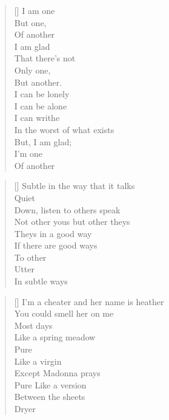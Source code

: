 \documentclass{article}
\begin{document}
\settowidth{\versewidth}{Than Tycho Brahe, or Erra Pater:}
\begin{verse}[\versewidth]
I am one            \\
But one,            \\
Of another          \\
I am glad           \\
That there's not    \\
Only one,           \\
But another.        \\
I can be lonely     \\
I can be alone      \\
I can writhe        \\
In the worst of what exists \\
But, I am glad;     \\
I'm one             \\
Of another          \\
\end{verse}

\settowidth{\versewidth}{Than Tycho Brahe, or Erra Pater:}
\begin{verse}[\versewidth]
Subtle in the way that it talks \\
Quiet \\
Down, listen to others speak \\
Not other yous but other theys \\
Theys in a good way \\ 
If there are good ways \\
To other \\
Utter \\
In subtle ways \\
\end{verse}


\settowidth{\versewidth}{Than Tycho Brahe, or Erra Pater:}
\begin{verse}[\versewidth]
I’m a cheater and her name is heather \\
You could smell her on me \\
Most days \\
Like a spring meadow \\
Pure \\
Like a virgin \\
Except Madonna prays \\
Pure
Like a version \\
Between the sheets \\
Dryer \\
\end{verse}
\end{document}
